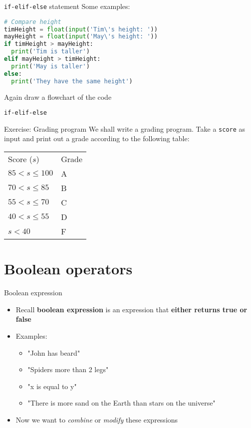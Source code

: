 \documentclass[10pt,xcolor={table,dvipsnames},t]{beamer}
\begin{document}
\begin{frame}[fragile]{\texttt{if-elif-else} statement}
  Some examples:
\begin{lstlisting}[language=python]
# Compare height
timHeight = float(input('Tim\'s height: '))
mayHeight = float(input('May\'s height: '))
if timHeight > mayHeight:
  print('Tim is taller')
elif mayHeight > timHeight:
  print('May is taller')
else:
  print('They have the same height')
\end{lstlisting}
  Again draw a flowchart of the code
\end{frame}

\begin{frame}[fragile]{\texttt{if-elif-else}}
  \begin{exampleblock}{Exercise: Grading program}
    We shall write a grading program. Take a \texttt{score} as input and print out a grade according to the following table:
    \begin{table}[]
      \begin{tabular}{ll}
      Score ($s$)      & Grade \\
      $85< s \leq 100$ & A     \\
      $70< s \leq 85$  & B     \\
      $55< s \leq 70$  & C     \\
      $40< s \leq 55$  & D     \\
      $s<40         $  & F
      \end{tabular}
      \end{table}
  \end{exampleblock}
\end{frame}

\section{Boolean operators}
\begin{frame}{Boolean expression}
  \begin{itemize}
    \item Recall \textbf{boolean expression} is an expression that \textbf{either returns true or false}
    \item Examples:
    \begin{itemize}
      \item "John has beard"
      \item "Spiders more than 2 legs"
      \item "x is equal to y"
      \item "There is more sand on the Earth than stars on the universe"
    \end{itemize}
    \item Now we want to \textit{combine} or \textit{modify} these expressions
  \end{itemize}
\end{frame}
\end{document}
